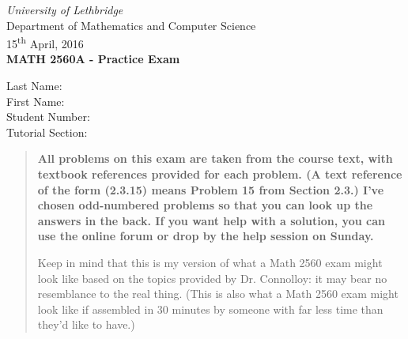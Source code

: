 \documentclass[12pt]{article}
\newcommand{\skipline}{\vspace{12pt}}
\begin{document}
\author{Instructor: Sean Fitzpatrick}
\thispagestyle{plain}
\begin{center}
\emph{University of Lethbridge}\\
Department of Mathematics and Computer Science\\
15\textsuperscript{th} April, 2016\\
{\bf MATH 2560A - Practice Exam}\\
\end{center}
\skipline \skipline \skipline \noindent \skipline
Last Name:\underline{\hspace{353pt}}\\
\skipline
First Name:\underline{\hspace{350pt}}\\
\skipline
Student Number:\underline{\hspace{323pt}}\\
\skipline
Tutorial Section: \underline{\hspace{320pt}}\\


\vspace{0.5in}


\begin{quote}
 {\bf All problems on this exam are taken from the course text, with textbook references provided for each problem. (A text reference of the form (2.3.15) means Problem 15 from Section 2.3.) I've chosen odd-numbered problems so that you can look up the answers in the back.  If you want help with a solution, you can use the online forum or drop by the help session on Sunday.
 
 Keep in mind that this is my version of what a Math 2560 exam might look like based on the topics provided by Dr. Connolloy: it may bear no resemblance to the real thing. (This is also what a Math 2560 exam might look like if assembled in 30 minutes by someone with far less time than they'd like to have.)}
\end{quote}


\vspace{0.5in}


\skipline

\skipline

\skipline


\newpage
\end{document}
